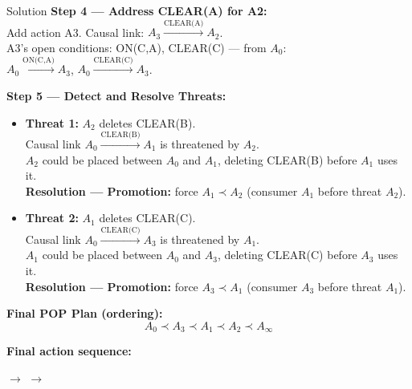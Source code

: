 \documentclass[12pt,a4paper]{article}
\begin{document}
\begin{solbox}{Solution}
\medskip
\textbf{Step 4 --- Address CLEAR(A) for A2:}\\
Add action A3. Causal link: $A_3 \xrightarrow{\text{CLEAR(A)}} A_2$.\\
A3's open conditions: ON(C,A), CLEAR(C) --- from $A_0$:\\
$A_0 \xrightarrow{\text{ON(C,A)}} A_3$, \quad $A_0 \xrightarrow{\text{CLEAR(C)}} A_3$.

\medskip
\textbf{Step 5 --- Detect and Resolve Threats:}

\begin{itemize}[leftmargin=*]
  \item \textbf{Threat 1:} $A_2$ deletes CLEAR(B).\\
    Causal link $A_0 \xrightarrow{\text{CLEAR(B)}} A_1$ is threatened by $A_2$.\\
    $A_2$ could be placed between $A_0$ and $A_1$, deleting CLEAR(B) before $A_1$ uses it.\\
    \textbf{Resolution --- Promotion:} force $A_1 \prec A_2$
    (consumer $A_1$ before threat $A_2$). \checkmark

  \item \textbf{Threat 2:} $A_1$ deletes CLEAR(C).\\
    Causal link $A_0 \xrightarrow{\text{CLEAR(C)}} A_3$ is threatened by $A_1$.\\
    $A_1$ could be placed between $A_0$ and $A_3$, deleting CLEAR(C) before $A_3$ uses it.\\
    \textbf{Resolution --- Promotion:} force $A_3 \prec A_1$
    (consumer $A_3$ before threat $A_1$). \checkmark
\end{itemize}

\bigskip
\textbf{Final POP Plan (ordering):}
\[
A_0 \prec A_3 \prec A_1 \prec A_2 \prec A_\infty
\]

\textbf{Final action sequence:}
\begin{center}
 $\longrightarrow$
 $\longrightarrow$
\end{center}


\end{solbox}
\end{document}
